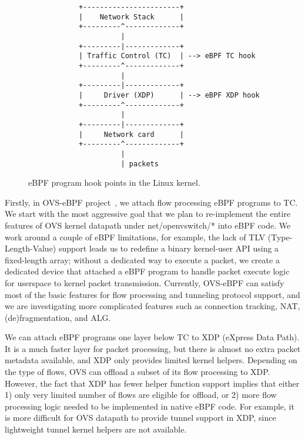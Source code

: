 \documentclass[10pt,numbers,reprint]{sigplanconf}
\begin{document}
\begin{figure}
{\scriptsize
\begin{verbatim}
            +-----------------------+
            |    Network Stack      |
            +---------^-------------+
                      |
            +---------|-------------+
            | Traffic Control (TC)  | --> eBPF TC hook
            +---------^-------------+
                      |
            +---------|-------------+
            |     Driver (XDP)      | --> eBPF XDP hook
            +---------^-------------+
                      |
            +---------|-------------+
            |     Network card      |
            +---------^-------------+
                      |
                      | packets
\end{verbatim}
}
\vspace{-1.0em}
\caption{eBPF program hook points in the Linux kernel.}
\label{ebpf-hook}
\vspace{-1.0em}
\end{figure}

Firstly, in OVS-eBPF project~\cite{extensible_ovs}, we attach flow processing
eBPF programs to TC. We start with the most aggressive goal that we plan to
re-implement the entire features of OVS kernel datapath under net/openvswitch/*
into eBPF code. We work around a couple of eBPF limitations, for example, the
lack of TLV (Type-Length-Value) support leads us to redefine a binary
kernel-user API using a fixed-length array; without a dedicated way to execute
a packet, we create a dedicated device that attached a eBPF program to handle
packet execute logic for userspace to kernel packet transmission. Currently,
OVS-eBPF can satisfy most of the basic features for flow processing and
tunneling protocol support, and we are investigating more complicated features
such as connection tracking, NAT, (de)fragmentation, and ALG.

We can attach eBPF programs one layer below TC to XDP (eXpress Data Path).
It is a much faster layer for packet processing, but there is almost no extra
packet metadata available, and XDP only provides limited kernel helpers.
Depending on the type of flows, OVS can offload a subset of its flow processing
to XDP. However, the fact that XDP has fewer helper function support implies
that either 1) only very limited number of flows are eligible for offload,
or 2) more flow processing logic needed to be implemented in native eBPF code.
For example, it is more difficult for OVS datapath to provide tunnel support in
XDP, since lightweight tunnel kernel helpers are not available.
\end{document}
